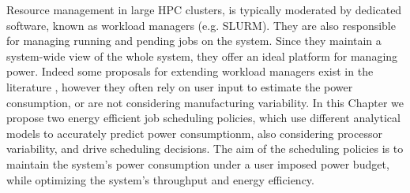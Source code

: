 Resource management in large HPC clusters, is typically moderated by dedicated software,
known as workload managers (e.g. SLURM).  They are also responsible for managing running
and pending jobs on the system.  Since they maintain a system-wide view of the whole system,
they offer an ideal platform for managing power.  Indeed some proposals for extending 
workload managers exist in the literature 
\cite{Gholkar:2016:PTH:2967938.2967961,7515666,Ellsworth:2015:DPS:2807591.2807643,Etinski2012615} 
, however they often rely on user input to estimate the power consumption, or are not
considering manufacturing variability.
In this Chapter we propose two energy efficient job scheduling policies, which use 
different analytical models to accurately predict power consumptionm, also considering
processor variability,  and drive scheduling decisions.  The aim of the scheduling policies
is to maintain the system's power consumption under a user imposed power budget, while 
optimizing the system's throughput and energy efficiency.
